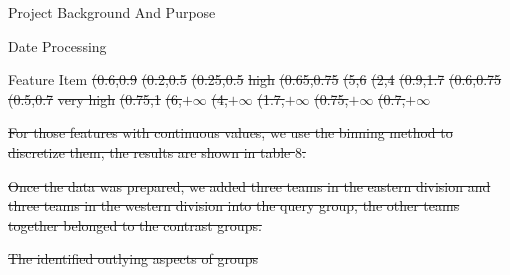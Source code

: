 \documentclass[
 size=14pt,
 paper=smartboard,  %
 mode=present, 		%
 display=slides, 	%
 style=tuliplab,  	%
 pauseslide,
 fleqn,leqno]{powerdot}
\providecommand{\DIFdeltex}[1]{{\protect\color{red}\sout{#1}}}                      %
\providecommand{\DIFdelbegin}{} %
\providecommand{\DIFdelend}{} %
\providecommand{\DIFdelFL}[1]{\DIFdel{#1}} %
\providecommand{\DIFdel}[1]{\texorpdfstring{\DIFdeltex{#1}}{}} %
\newcommand{\DIFscaledelfig}{0.5}
\newlength{\DIFdelgraphicswidth} %
\newlength{\DIFdelgraphicsheight} %
\newcommand{\DIFdelincludegraphics}[2][]{%
\sbox{\DIFdelgraphicsbox}{\DIFOincludegraphics[#1]{#2}}%
\settoboxwidth{\DIFdelgraphicswidth}{\DIFdelgraphicsbox} %
\settoboxtotalheight{\DIFdelgraphicsheight}{\DIFdelgraphicsbox} %
\scalebox{\DIFscaledelfig}{%
\parbox[b]{\DIFdelgraphicswidth}{\usebox{\DIFdelgraphicsbox}\\[-\baselineskip] \rule{\DIFdelgraphicswidth}{0em}}\llap{\resizebox{\DIFdelgraphicswidth}{\DIFdelgraphicsheight}{%
\setlength{\unitlength}{\DIFdelgraphicswidth}%
\begin{picture}(1,1)%
\thicklines\linethickness{2pt} %
{\color[rgb]{1,0,0}\put(0,0){\framebox(1,1){}}}%
{\color[rgb]{1,0,0}\put(0,0){\line( 1,1){1}}}%
{\color[rgb]{1,0,0}\put(0,1){\line(1,-1){1}}}%
\end{picture}%
}\hspace*{3pt}}} %
} %
\DeclareRobustCommand{\DIFdelbegin}{\DIFOdelbegin \let\includegraphics\DIFdelincludegraphics} %
\DeclareRobustCommand{\DIFdelend}{\DIFOaddend \let\includegraphics\DIFOincludegraphics} %
\begin{document}
\begin{slide}
\begin{slide}{Project Background And Purpose}
\begin{slide}{Date Processing}
\begin{slide}{Feature Item}
\DIFdelFL{(0.6,0.9}%
\DIFdelFL{(0.2,0.5}%
\DIFdelFL{(0.25,0.5}%
\DIFdelFL{high  }%
\DIFdelFL{(0.65,0.75}%
\DIFdelFL{(5,6}%
\DIFdelFL{(2,4}%
\DIFdelFL{(0.9,1.7}%
\DIFdelFL{(0.6,0.75}%
\DIFdelFL{(0.5,0.7}%
\DIFdelFL{very high}%
\DIFdelFL{(0.75,1}%
\DIFdelFL{(6,$+\infty$}%
\DIFdelFL{(4,$+\infty$}%
\DIFdelFL{(1.7,$+\infty$}%
\DIFdelFL{(0.75,$+\infty$}%
\DIFdelFL{(0.7,$+\infty$}%

\DIFdel{For those features with continuous values,
we use the binning method to discretize them, the results are shown in table $8$.
}%

\DIFdel{Once the data was prepared,
we added three teams in the eastern division
and three teams in the western division into the query group,
the other teams together belonged to the contrast groups.
}%

\DIFdelend %

\DIFdelbegin %

{%
\DIFdelFL{The identified outlying aspects of groups}}


\end{slide}
\end{slide}
\end{slide}
\end{slide}
\end{document}
